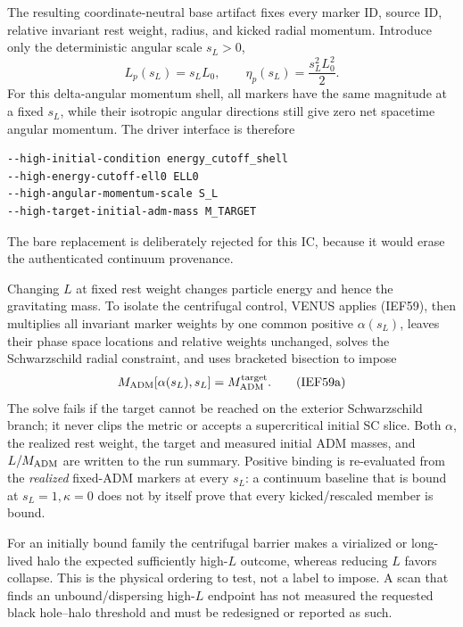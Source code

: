 The resulting coordinate-neutral base artifact fixes every marker ID, source
ID, relative invariant rest weight, radius, and kicked radial momentum.
Introduce only the deterministic angular scale \(s_L>0\),
\[
 L_p(s_L)=s_LL_0,\qquad
 \eta_p(s_L)=\frac{s_L^2L_0^2}{2}.                 \tag{IEF59}
\]
For this delta-angular momentum shell, all markers have the same magnitude at
a fixed \(s_L\), while their isotropic angular directions still give zero net
spacetime angular momentum.  The driver interface is therefore
\begin{lstlisting}[basicstyle=\ttfamily\scriptsize]
--high-initial-condition energy_cutoff_shell
--high-energy-cutoff-ell0 ELL0
--high-angular-momentum-scale S_L
--high-target-initial-adm-mass M_TARGET
\end{lstlisting}
The bare  replacement is deliberately
rejected for this IC, because it would erase the authenticated continuum
provenance.

Changing \(L\) at fixed rest weight changes particle energy and hence the
gravitating mass.  To isolate the centrifugal control, VENUS applies (IEF59),
then multiplies all invariant marker weights by one common positive
\(\alpha(s_L)\), leaves their phase space locations and relative weights
unchanged, solves the Schwarzschild radial constraint, and uses bracketed
bisection to impose
\[
 M_{\rm ADM}\!\left[\alpha(s_L),s_L\right]
       =M_{\rm ADM}^{\rm target}.                       \tag{IEF59a}
\]
The solve fails if the target cannot be reached on the exterior Schwarzschild
branch; it never clips the metric or accepts a supercritical initial SC slice.
Both \(\alpha\), the realized rest weight, the target and measured initial ADM
masses, and \(L/M_{\rm ADM}\) are written to the run summary.  Positive
binding is re-evaluated from the \emph{realized} fixed-ADM markers at every
\(s_L\): a continuum baseline that is bound at \(s_L=1,\kappa=0\) does not by
itself prove that every kicked/rescaled member is bound.

For an initially bound family the centrifugal barrier makes a virialized or
long-lived halo the expected sufficiently high-\(L\) outcome, whereas reducing
\(L\) favors collapse.  This is the physical ordering to test, not a label to
impose.  A scan that finds an unbound/dispersing high-\(L\) endpoint has not
measured the requested black hole--halo threshold and must be redesigned or
reported as such.

